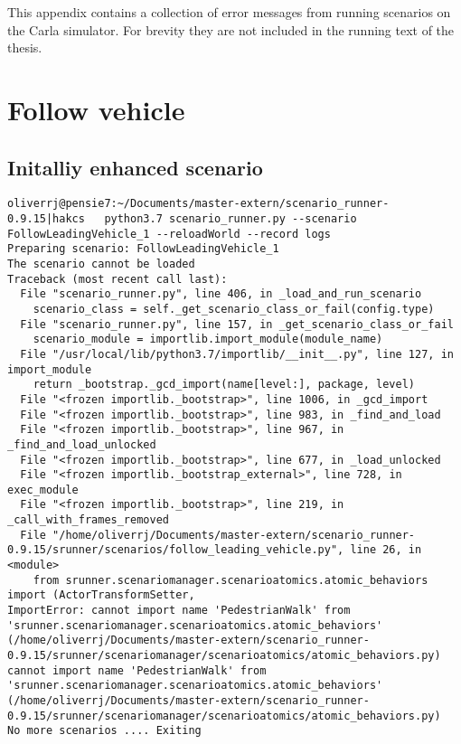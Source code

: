 This appendix contains a collection of error messages from running scenarios on the Carla simulator.
For brevity they are not included in the running text of the thesis.

\section{Follow vehicle}

\subsection{Initalliy enhanced scenario }

\begin{lstlisting}[caption={Error message when running the the initially enhanced  FollowLeadingVehicle scenario with halluciantion. }, label={lst:hallucinatedFollowError}]
    oliverrj@pensie7:~/Documents/master-extern/scenario_runner-0.9.15|hakcs   python3.7 scenario_runner.py --scenario FollowLeadingVehicle_1 --reloadWorld --record logs
Preparing scenario: FollowLeadingVehicle_1
The scenario cannot be loaded
Traceback (most recent call last):
  File "scenario_runner.py", line 406, in _load_and_run_scenario
    scenario_class = self._get_scenario_class_or_fail(config.type)
  File "scenario_runner.py", line 157, in _get_scenario_class_or_fail
    scenario_module = importlib.import_module(module_name)
  File "/usr/local/lib/python3.7/importlib/__init__.py", line 127, in import_module
    return _bootstrap._gcd_import(name[level:], package, level)
  File "<frozen importlib._bootstrap>", line 1006, in _gcd_import
  File "<frozen importlib._bootstrap>", line 983, in _find_and_load
  File "<frozen importlib._bootstrap>", line 967, in _find_and_load_unlocked
  File "<frozen importlib._bootstrap>", line 677, in _load_unlocked
  File "<frozen importlib._bootstrap_external>", line 728, in exec_module
  File "<frozen importlib._bootstrap>", line 219, in _call_with_frames_removed
  File "/home/oliverrj/Documents/master-extern/scenario_runner-0.9.15/srunner/scenarios/follow_leading_vehicle.py", line 26, in <module>
    from srunner.scenariomanager.scenarioatomics.atomic_behaviors import (ActorTransformSetter,
ImportError: cannot import name 'PedestrianWalk' from 'srunner.scenariomanager.scenarioatomics.atomic_behaviors' (/home/oliverrj/Documents/master-extern/scenario_runner-0.9.15/srunner/scenariomanager/scenarioatomics/atomic_behaviors.py)
cannot import name 'PedestrianWalk' from 'srunner.scenariomanager.scenarioatomics.atomic_behaviors' (/home/oliverrj/Documents/master-extern/scenario_runner-0.9.15/srunner/scenariomanager/scenarioatomics/atomic_behaviors.py)
No more scenarios .... Exiting

\end{lstlisting}

